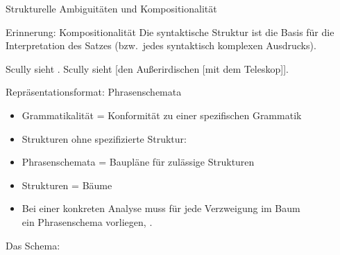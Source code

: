\begin{frame}
  {Strukturelle Ambiguitäten und Kompositionalität}
  \pause
  \begin{exe}
  \end{exe}
  \pause
  \Halbzeile
  \begin{block}{Erinnerung: Kompositionalität}
    Die syntaktische Struktur ist die Basis für die Interpretation des Satzes (bzw.\ jedes syntaktisch komplexen Ausdrucks).
  \end{block}
  \pause
  \Halbzeile
  \begin{exe}
    \ex
    \begin{xlist}
      \ex Scully sieht  .
      \pause
      \pause
      \pause
      \ex Scully sieht \alert<8->{[den Außerirdischen [mit dem Teleskop]]}.
    \end{xlist}
  \end{exe}
\end{frame}



\begin{frame}
  {Repräsentationsformat: Phrasenschemata}
  \pause
  \begin{itemize}[<+->]
    \item \alert{Grammatikalität = Konformität zu einer spezifischen Grammatik}
    \item Strukturen ohne spezifizierte Struktur: 
      \Halbzeile
    \item Phrasenschemata = \alert{Baupläne} für zulässige Strukturen
    \item Strukturen = \alert{Bäume}
    \item Bei einer konkreten Analyse muss für jede Verzweigung im Baum\\
      ein Phrasenschema vorliegen, .
  \end{itemize}
  \pause
  \Halbzeile
  \centering
  \begin{multicols}{2}
    \footnotesize Das Schema:~
  \end{multicols}
\end{frame}

